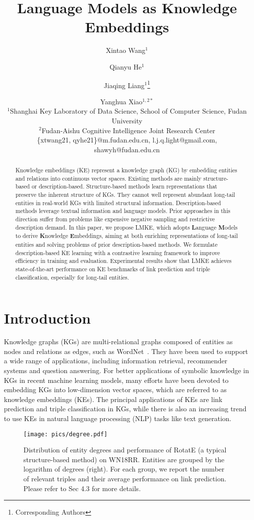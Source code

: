 \documentclass{article}
\title{Language Models as Knowledge Embeddings}
\author{
Xintao Wang$^1$\and
Qianyu He$^1$\and
Jiaqing Liang$^1$\footnote{Corresponding Authors}\and
Yanghua Xiao$^{1,2*}$\\
\affiliations
$^1$Shanghai Key Laboratory of Data Science, School of Computer Science, Fudan University\\
$^2$Fudan-Aishu Cognitive Intelligence Joint Research Center\\
\emails
\{xtwang21, qyhe21\}@m.fudan.edu.cn,
l.j.q.light@gmail.com,
shawyh@fudan.edu.cn
}
\begin{document}
\maketitle

\begin{abstract}
Knowledge embeddings (KE) represent a knowledge graph (KG) by embedding entities and relations into continuous vector spaces.
Existing methods are mainly structure-based or description-based. 
Structure-based methods learn representations that preserve the inherent structure of KGs. 
They cannot well represent abundant long-tail entities in real-world KGs with limited structural information.
Description-based methods leverage textual information and language models. 
Prior approaches in this direction suffer from problems like expensive negative sampling and restrictive description demand.
In this paper, we propose LMKE, which adopts 
\textbf{L}anguage \textbf{M}odels to derive \textbf{K}nowledge \textbf{E}mbeddings, aiming at both enriching representations of long-tail entities and solving problems of prior description-based methods.
We formulate description-based KE learning with a contrastive learning framework to improve efficiency in  training and evaluation.
Experimental results show that LMKE achieves state-of-the-art performance on KE benchmarks of link prediction and triple classification, especially for long-tail entities.



\end{abstract}

\section{Introduction}

Knowledge graphs (KGs) are multi-relational graphs composed of entities as nodes and relations as edges, such as WordNet~\cite{miller1995wordnet}. They have been used to support a wide range of applications, including information retrieval, recommender systems and question answering. 
For better applications of symbolic knowledge in KGs in recent machine learning models, 
many efforts have been devoted to embedding KGs into low-dimension vector spaces, which are referred to as knowledge embeddings (KEs).
The principal applications of KEs are link prediction and triple classification in KGs, while there is also an increasing trend to use KEs in natural language processing (NLP) tasks like text generation.

\begin{figure}[t]
    \centering
        \texttt{[image: pics/degree.pdf]}
    \caption{
    Distribution of entity degrees and performance of RotatE (a typical structure-based method) on WN18RR. Entities are grouped by the logarithm of degrees (right). For each group, we report the number of relevant triples and their average performance on link prediction. Please refer to Sec 4.3 for more details.}
    \label{fig:long-tail}
\end{figure}
\end{document}
